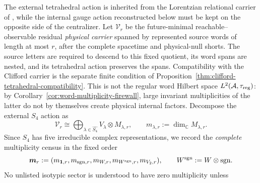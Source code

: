 \documentclass[11pt]{article}
\numberwithin{equation}{section}
\theoremstyle{definition}
\theoremstyle{remark}
\newcommand{\C}{\mathbb C}
\newcommand{\A}{\mathcal A}
\begin{document}
The external tetrahedral action is inherited from the Lorentzian relational
carrier of \cite{PelissierSpacetime2026}, while the internal gauge action
reconstructed below must be kept on the opposite side of the centralizer.
Let $\mathcal V_r$ be the future-minimal
reachable--observable residual \emph{physical carrier} spanned by represented
source words of length at most $r$, after the complete spacetime and
physical-null shorts.  The source letters are required to descend to this fixed quotient, its
word spans are nested, and its tetrahedral action preserves the spans.
Compatibility with the Clifford carrier is the separate finite condition of
Proposition~\ref{thm:clifford-tetrahedral-compatibility}.  This is not the regular word Hilbert space
$L^2(\A,\tau_{\rm reg})$: by Corollary~\ref{cor:word-multiplicity-firewall},
large invariant multiplicities of the latter do not by themselves create
physical internal factors.  Decompose the external $S_4$ action as
\begin{equation}
\mathcal V_r
\cong
\bigoplus_{\lambda\in\widehat{S_4}}
V_\lambda\otimes M_{\lambda,r},
\qquad
m_{\lambda,r}:=\dim_\C M_{\lambda,r}.
\label{eq:word-depth-isotypic}
\end{equation}
Since $S_4$ has five irreducible complex representations, we record the
\emph{complete} multiplicity census in the fixed order
\begin{equation}
\bm m_r
:=
(m_{\mathbf1,r},m_{{\rm sgn},r},m_{W,r},
  m_{W^{\rm sgn},r},m_{V_2,r}),
\qquad W^{\rm sgn}:=W\otimes{\rm sgn}.
\label{eq:complete-S4-census}
\end{equation}
No unlisted isotypic sector is understood to have zero multiplicity unless
\end{document}
